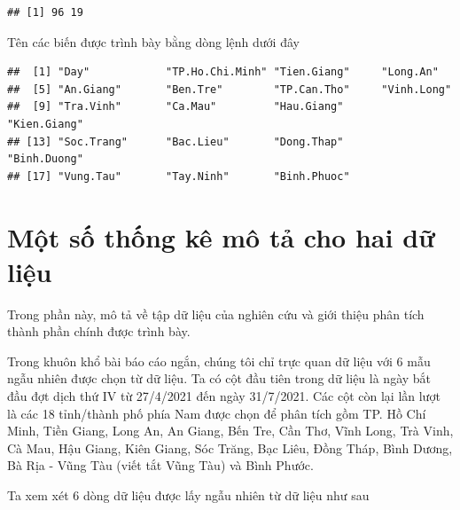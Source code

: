 \documentclass[../thesis.tex]{subfiles}
\begin{document}
\begin{verbatim}
## [1] 96 19
\end{verbatim}

Tên các biến được trình bày bằng dòng lệnh dưới đây

\begin{Shaded}
	\begin{Highlighting}[]
\SpecialCharTok{\%\textgreater{}\%} \NormalTok{()}
	\end{Highlighting}
\end{Shaded}

\begin{verbatim}
##  [1] "Day"            "TP.Ho.Chi.Minh" "Tien.Giang"     "Long.An"       
##  [5] "An.Giang"       "Ben.Tre"        "TP.Can.Tho"     "Vinh.Long"     
##  [9] "Tra.Vinh"       "Ca.Mau"         "Hau.Giang"      "Kien.Giang"    
## [13] "Soc.Trang"      "Bac.Lieu"       "Dong.Thap"      "Binh.Duong"    
## [17] "Vung.Tau"       "Tay.Ninh"       "Binh.Phuoc"
\end{verbatim}

\newpage
\section{Một số thống kê mô tả cho hai dữ liệu}

Trong phần này, mô tả về tập dữ liệu của nghiên cứu và giới thiệu phân tích thành phần chính được trình bày.

Trong khuôn khổ bài báo cáo ngắn, chúng tôi chỉ trực quan dữ liệu với 6 mẫu ngẫu nhiên được chọn từ dữ liệu. Ta có cột đầu tiên trong dữ liệu là ngày bắt đầu đợt dịch thứ IV từ 27/4/2021 đến ngày 31/7/2021. Các cột còn lại lần lượt là các 18 tỉnh/thành phố phía Nam được chọn để phân tích gồm TP. Hồ Chí Minh, Tiền Giang, Long An, An Giang, Bến Tre, Cần Thơ, Vĩnh Long, Trà Vinh, Cà Mau, Hậu Giang, Kiên Giang, Sóc Trăng, Bạc Liêu, Đồng Tháp, Bình Dương, Bà Rịa - Vũng Tàu (viết tắt Vũng Tàu) và Bình Phước.

Ta xem xét 6 dòng dữ liệu được lấy ngẫu nhiên từ dữ liệu như sau
\begin{Shaded}
	\begin{Highlighting}[]
\SpecialCharTok{\%\textgreater{}\%} \NormalTok{)}
	\end{Highlighting}
\end{Shaded}
\end{document}
